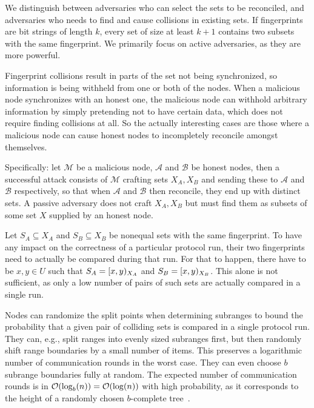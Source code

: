 \documentclass[conference]{IEEEtran}
\begin{document}
We distinguish between  adversaries who can select the sets to be reconciled, and  adversaries who needs to find and cause collisions in existing sets. If fingerprints are bit strings of length $k$, every set of size at least $k + 1$ contains two subsets with the same fingerprint. We primarily focus on active adversaries, as they are more powerful.

Fingerprint collisions result in parts of the set not being synchronized, so information is being withheld from one or both of the nodes. When a malicious node synchronizes with an honest one, the malicious node can withhold arbitrary information by simply pretending not to have certain data, which does not require finding collisions at all. So the actually interesting cases are those where a malicious node can cause honest nodes to incompletely reconcile amongst themselves.

Specifically: let $\mathcal{M}$ be a malicious node, $\mathcal{A}$ and $\mathcal{B}$ be honest nodes, then a successful attack consists of $\mathcal{M}$ crafting sets $X_A, X_B$ and sending these to $\mathcal{A}$ and $\mathcal{B}$ respectively, so that when $\mathcal{A}$ and $\mathcal{B}$ then reconcile, they end up with distinct sets. A passive adversary does not craft $X_A, X_B$ but must find them as subsets of some set $X$ supplied by an honest node.

Let $S_A \subseteq X_A$ and $S_B \subseteq X_B$ be nonequal sets with the same fingerprint. To have any impact on the correctness of a particular protocol run, their two fingerprints need to actually be compared during that run. For that to happen, there have to be $x, y \in U$ such that $S_A = [{x},{y})_{X_A}$ and $S_B = [{x},{y})_{X_B}$. This alone is not sufficient, as only a low number of pairs of such sets are actually compared in a single run.

Nodes can randomize the split points when determining subranges to bound the probability that a given pair of colliding sets is compared in a single protocol run. They can, e.g., split ranges into evenly sized subranges first, but then randomly shift range boundaries by a small number of items. This preserves a logarithmic number of communication rounds in the worst case. They can even choose $b$ subrange boundaries fully at random. The expected number of communication rounds is in $\mathcal{O}(\log_b(n)) = \mathcal{O}(\log(n))$ with high probability, as it corresponds to the height of a randomly chosen $b$-complete tree~\cite{devroye1990height}.
\end{document}
